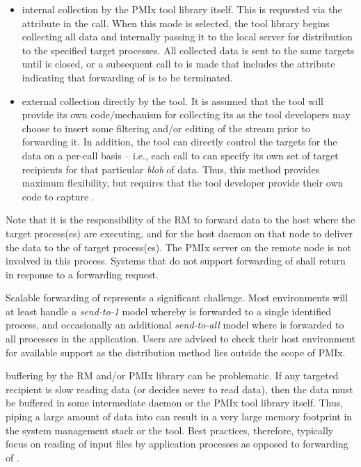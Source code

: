 \begin{itemize}
    \item internal collection by the \ac{PMIx} tool library itself. This is requested via the  attribute in the  call. When this mode is selected, the tool library begins collecting all  data and internally passing it to the local server for distribution to the specified target processes. All collected data is sent to the same targets until  is closed, or a subsequent call to  is made that includes the  attribute indicating that forwarding of  is to be terminated.
    \item external collection directly by the tool. It is assumed that the tool will provide its own code/mechanism for collecting its  as the tool developers may choose to insert some filtering and/or editing of the stream prior to forwarding it. In addition, the tool can directly control the targets for the data on a per-call basis – i.e., each call to  can specify its own set of target recipients for that particular \emph{blob} of data. Thus, this method provides maximum flexibility, but requires that the tool developer provide their own code to capture .
\end{itemize}

Note that it is the responsibility of the \ac{RM} to forward data to the host where the target process(es) are executing, and for the host daemon on that node to deliver the data to the  of target process(es). The \ac{PMIx} server on the remote node is not involved in this process. Systems that do not support forwarding of  shall return  in response to a forwarding request.

\adviceuserstart
Scalable forwarding of  represents a significant challenge. Most environments will at least handle a \emph{send-to-1} model whereby  is forwarded to a single identified process, and occasionally an additional \emph{send-to-all} model where  is forwarded to all processes in the application. Users are advised to check their host environment for available support as the distribution method lies outside the scope of \ac{PMIx}.

 buffering by the \ac{RM} and/or \ac{PMIx} library can be problematic. If any targeted recipient is slow reading data (or decides never to read data), then the data must be buffered in some intermediate daemon or the \ac{PMIx} tool library itself. Thus, piping a large amount of data into  can result in a very large memory footprint in the system management stack or the tool. Best practices, therefore, typically focus on reading of input files by application processes as opposed to forwarding of .
\adviceuserend


